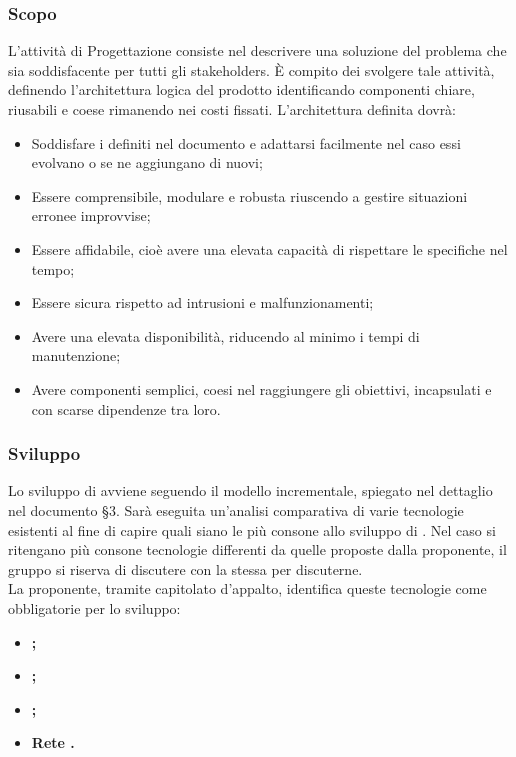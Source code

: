 \documentclass[NormeDiProgetto.tex]{subfiles}
\begin{document}
\subsubsection{Scopo}
L’attività di Progettazione consiste nel descrivere una soluzione del problema
che sia soddisfacente per tutti gli stakeholders.
\`{E} compito dei \progi svolgere tale attività, definendo l’architettura logica
del prodotto identificando componenti chiare, riusabili e coese rimanendo nei
costi fissati. L’architettura definita dovrà:
\begin{itemize}
	\item Soddisfare i  definiti nel documento \adr e adattarsi facilmente nel caso essi evolvano o se ne aggiungano di nuovi; 
	\item Essere comprensibile, modulare e robusta riuscendo a gestire situazioni erronee improvvise;
	\item Essere affidabile, cioè avere una elevata capacità di rispettare le specifiche nel tempo;
	\item Essere sicura rispetto ad intrusioni e malfunzionamenti;
	\item Avere una elevata disponibilità, riducendo al minimo i tempi di manutenzione;
	\item Avere componenti semplici, coesi nel raggiungere gli obiettivi, incapsulati e con scarse dipendenze tra loro.
\end{itemize}

\subsubsection{Sviluppo}
Lo sviluppo di \progetto avviene seguendo il modello incrementale, spiegato nel dettaglio nel documento \pdp \S 3. Sarà eseguita un'analisi comparativa di varie tecnologie esistenti al fine di capire quali siano le più consone allo sviluppo di \progetto. Nel caso si ritengano più consone tecnologie differenti da quelle proposte dalla proponente, il gruppo \gruppo si riserva di discutere con la stessa per discuterne.\\
La proponente, tramite capitolato d'appalto, identifica queste tecnologie come obbligatorie per lo sviluppo:\\
\begin{itemize}
	\item \textbf{;}
	\item \textbf{;}
	\item \textbf{;}
	\item \textbf{Rete .}
\end{itemize}
\end{document}
